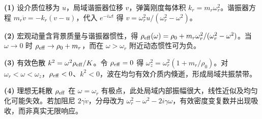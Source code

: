 \par\noindent\textbf{(1)} 设介质位移为 \(u\)，局域谐振器位移 \(v\)，弹簧刚度每体积 \(k_r=m_r\omega_r^2\)。谐振器方程 \(m_r\ddot v=-k_r(v-u)\)，代入 \(e^{-i\omega t}\) 得 \(v=\omega_r^2u/(\omega_r^2-\omega^2)\)。
\par\noindent\textbf{(2)} 宏观动量含背景质量与谐振器惯性，得 \(\rho_{\rm eff}(\omega)=\rho_0+m_r\omega_r^2/(\omega_r^2-\omega^2)\)。当 \(\omega\to0\) 时 \(\rho_{\rm eff}\to\rho_0+m_r\)，而在 \(\omega>\omega_r\) 附近动态惯性可为负。
\par\noindent\textbf{(3)} 有效色散 \(k^2=\omega^2\rho_{\rm eff}/K\)。令 \(\rho_{\rm eff}=0\) 得 \(\omega_z^2=\omega_r^2(1+m_r/\rho_0)\)。对 \(\omega_r<\omega<\omega_z\)，\(\rho_{\rm eff}<0\)、\(k^2<0\)，波在均匀有效介质内倏逝，形成局域共振禁带。
\par\noindent\textbf{(4)} 理想无耗散 \(\rho_{\rm eff}\) 在 \(\omega=\omega_r\) 有极点，此处局域内部振幅很大，线性近似及均匀化可能失效。若加阻尼 \(2\gamma\dot v\)，分母改为 \(\omega_r^2-\omega^2-2i\gamma\omega\)，有效密度变复数并出现吸收，而非真实无限响应。

